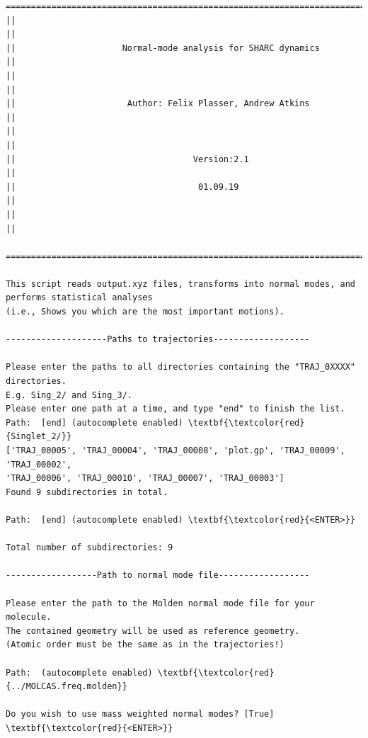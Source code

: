 \documentclass[a4paper,11pt,DIV=15,openany]{scrbook}
\begin{document}
\begin{oframed}
\footnotesize\begin{Verbatim}[commandchars=\\\{\}]
  ================================================================================
||                                                                                ||
||                     Normal-mode analysis for SHARC dynamics                    ||
||                                                                                ||
||                      Author: Felix Plasser, Andrew Atkins                      ||
||                                                                                ||
||                                   Version:2.1                                  ||
||                                    01.09.19                                    ||
||                                                                                ||
  ================================================================================

This script reads output.xyz files, transforms into normal modes, and performs statistical analyses 
(i.e., Shows you which are the most important motions).
  
--------------------Paths to trajectories-------------------

Please enter the paths to all directories containing the "TRAJ_0XXXX" directories.
E.g. Sing_2/ and Sing_3/. 
Please enter one path at a time, and type "end" to finish the list.
Path:  [end] (autocomplete enabled) \textbf{\textcolor{red}{Singlet_2/}}
['TRAJ_00005', 'TRAJ_00004', 'TRAJ_00008', 'plot.gp', 'TRAJ_00009', 'TRAJ_00002', 
'TRAJ_00006', 'TRAJ_00010', 'TRAJ_00007', 'TRAJ_00003']
Found 9 subdirectories in total.

Path:  [end] (autocomplete enabled) \textbf{\textcolor{red}{<ENTER>}}

Total number of subdirectories: 9

------------------Path to normal mode file------------------

Please enter the path to the Molden normal mode file for your molecule. 
The contained geometry will be used as reference geometry.
(Atomic order must be the same as in the trajectories!)

Path:  (autocomplete enabled) \textbf{\textcolor{red}{../MOLCAS.freq.molden}}

Do you wish to use mass weighted normal modes? [True] \textbf{\textcolor{red}{<ENTER>}}


\end{Verbatim}
\end{oframed}
\end{document}
